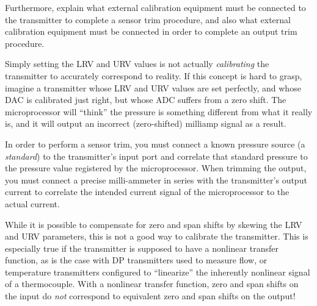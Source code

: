 Furthermore, explain what external calibration equipment must be connected to the transmitter to complete a sensor trim procedure, and also what external calibration equipment must be connected in order to complete an output trim procedure.







Simply setting the LRV and URV values is not actually {\it calibrating} the transmitter to accurately correspond to reality.  If this concept is hard to grasp, imagine a transmitter whose LRV and URV values are set perfectly, and whose DAC is calibrated just right, but whose ADC suffers from a zero shift.  The microprocessor will ``think'' the pressure is something different from what it really is, and it will output an incorrect (zero-shifted) milliamp signal as a result.

\vskip 10pt

In order to perform a sensor trim, you must connect a known pressure source (a {\it standard}) to the transmitter's input port and correlate that standard pressure to the pressure value registered by the microprocessor.  When trimming the output, you must connect a precise milli-ammeter in series with the transmitter's output current to correlate the intended current signal of the microprocessor to the actual current.







While it is possible to compensate for zero and span shifts by skewing the LRV and URV parameters, this is not a good way to calibrate the transmitter.  This is especially true if the transmitter is supposed to have a nonlinear transfer function, as is the case with DP transmitters used to measure flow, or temperature transmitters configured to ``linearize'' the inherently nonlinear signal of a thermocouple.  With a nonlinear transfer function, zero and span shifts on the input do {\it not} correspond to equivalent zero and span shifts on the output!





